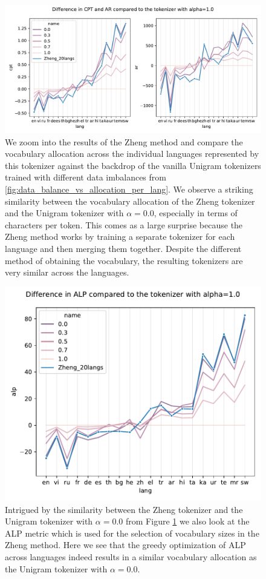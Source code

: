 \begin{figure}[H]
    \centering
    \includegraphics[width=\textwidth]{figures/zheng_vs_alphas.pdf}
    \caption{We zoom into the results of the Zheng method and compare the vocabulary allocation across the individual languages represented by this tokenizer against the backdrop of the vanilla Unigram tokenizers trained with different data imbalances from \ref{fig:data_balance_vs_allocation_per_lang}. We observe a striking similarity between the vocabulary allocation of the Zheng tokenizer and the Unigram tokenizer with $\alpha=0.0$, especially in terms of characters per token. This comes as a large surprise because the Zheng method works by training a separate tokenizer for each language and then merging them together. Despite the different method of obtaining the vocabulary, the resulting tokenizers are very similar across the languages.}
    \label{fig:zheng_vs_alphas}
\end{figure}

\begin{figure}[H]
    \centering
    \includegraphics[width=\textwidth]{figures/zheng_vs_alphas_alp.pdf}
    \caption{Intrigued by the similarity between the Zheng tokenizer and the Unigram tokenizer with $\alpha=0.0$ from Figure \ref{fig:zheng_vs_alphas} we also look at the ALP metric which is used for the selection of vocabulary sizes in the Zheng method. Here we see that the greedy optimization of ALP across languages indeed results in a similar vocabulary allocation as the Unigram tokenizer with $\alpha=0.0$.}
    \label{fig:zheng_vs_alphas_alp}
\end{figure}

